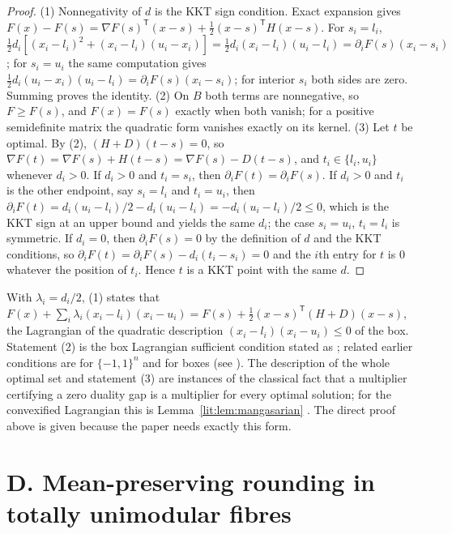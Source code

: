 \begin{proof}
(1) Nonnegativity of $d$ is the KKT sign condition. Exact expansion gives
$F(x)-F(s)=\nabla F(s)^{\mathsf T}(x-s)+\tfrac12(x-s)^{\mathsf T}H(x-s)$. For $s_i=l_i$,
$\tfrac12d_i[(x_i-l_i)^2+(x_i-l_i)(u_i-x_i)]=\tfrac12d_i(x_i-l_i)(u_i-l_i)=\partial_iF(s)(x_i-s_i)$;
for $s_i=u_i$ the same computation gives $\tfrac12d_i(u_i-x_i)(u_i-l_i)=\partial_iF(s)(x_i-s_i)$;
for interior $s_i$ both sides are zero. Summing proves the identity.
(2) On $B$ both terms are nonnegative, so $F\ge F(s)$, and $F(x)=F(s)$ exactly when both vanish;
for a positive semidefinite matrix the quadratic form vanishes exactly on its kernel.
(3) Let $t$ be optimal. By (2), $(H+D)(t-s)=0$, so $\nabla F(t)=\nabla F(s)+H(t-s)=\nabla F(s)-D(t-s)$,
and $t_i\in\{l_i,u_i\}$ whenever $d_i>0$. If $d_i>0$ and $t_i=s_i$, then
$\partial_iF(t)=\partial_iF(s)$. If $d_i>0$ and $t_i$ is the other endpoint, say $s_i=l_i$ and
$t_i=u_i$, then $\partial_iF(t)=d_i(u_i-l_i)/2-d_i(u_i-l_i)=-d_i(u_i-l_i)/2\le0$, which is the
KKT sign at an upper bound and yields the same $d_i$; the case $s_i=u_i$, $t_i=l_i$ is symmetric.
If $d_i=0$, then $\partial_iF(s)=0$ by the definition of $d$ and the KKT conditions, so
$\partial_iF(t)=\partial_iF(s)-d_i(t_i-s_i)=0$ and the $i$th entry for $t$ is $0$ whatever the
position of $t_i$. Hence $t$ is a KKT point with the same $d$.
\end{proof}

\begin{remark}[Attribution]
With $\lambda_i=d_i/2$, (1) states that
$F(x)+\sum_i\lambda_i(x_i-l_i)(x_i-u_i)=F(s)+\tfrac12(x-s)^{\mathsf T}(H+D)(x-s)$, the Lagrangian
of the quadratic description $(x_i-l_i)(x_i-u_i)\le0$ of the box. Statement (2) is the box
Lagrangian sufficient condition stated as \cite[Corollary~2]{LiWuQuan2015}; related earlier
conditions are \cite[Theorem~2.3]{BeckTeboulle2000} for $\{-1,1\}^n$ and
\cite{JeyakumarRubinovWu2006} for boxes (see \cite[Proposition~2.1]{HuyJeyakumarLee2006}).
The description of the whole optimal set and statement (3) are instances of the classical fact
that a multiplier certifying a zero duality gap is a multiplier for every optimal solution;
for the convexified Lagrangian this is Lemma~\ref{lit:lem:mangasarian}
\cite{Mangasarian1988,BurkeFerris1991,JeyakumarLeeDinh2004}. The direct proof above is given
because the paper needs exactly this form.
\end{remark}

\section*{D. Mean-preserving rounding in totally unimodular fibres}

